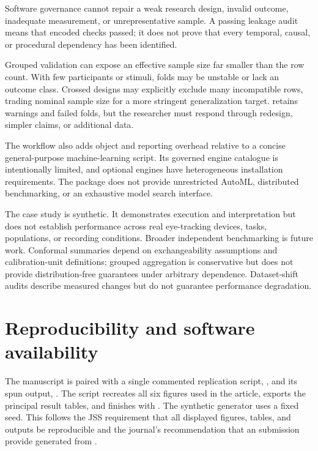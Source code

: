 \documentclass[article]{jss}
\begin{document}
Software governance cannot repair a weak research design, invalid outcome, inadequate
measurement, or unrepresentative sample. A passing leakage audit means that encoded
checks passed; it does not prove that every temporal, causal, or procedural dependency
has been identified.

Grouped validation can expose an effective sample size far smaller than the row count.
With few participants or stimuli, folds may be unstable or lack an outcome class.
Crossed designs may explicitly exclude many incompatible rows, trading nominal sample
size for a more stringent generalization target.  retains warnings and
failed folds, but the researcher must respond through redesign, simpler claims, or
additional data.

The workflow also adds object and reporting overhead relative to a concise
general-purpose machine-learning script. Its governed engine catalogue is intentionally
limited, and optional engines have heterogeneous installation requirements. The package
does not provide unrestricted AutoML, distributed benchmarking, or an exhaustive model
search interface.

The case study is synthetic. It demonstrates execution and interpretation but does not
establish performance across real eye-tracking devices, tasks, populations, or recording
conditions. Broader independent benchmarking is future work. Conformal summaries depend
on exchangeability assumptions and calibration-unit definitions; grouped aggregation is
conservative but does not provide distribution-free guarantees under arbitrary
dependence. Dataset-shift audits describe measured changes but do not guarantee
performance degradation.

\section{Reproducibility and software availability}
\label{sec:reproducibility}

The manuscript is paired with a single commented replication script,
, and its spun output, . The script recreates all six
figures used in the article, exports the principal result tables, and finishes with
. The synthetic generator uses a fixed seed. This follows the JSS
requirement that all displayed figures, tables, and outputs be reproducible and the
journal's recommendation that an  submission provide
 generated from .
\end{document}
